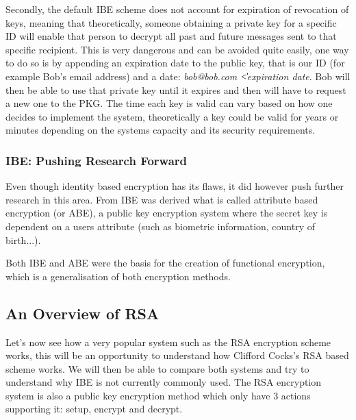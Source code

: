\documentclass[conference]{IEEEtran}
\begin{document}
Secondly, the default IBE scheme does not account for expiration of revocation of keys,
meaning that theoretically, someone obtaining a private key for a specific ID will enable 
that person to decrypt all past and future messages sent to that specific recipient.
This is very dangerous and can be avoided quite easily, one way to do so is by appending an 
expiration date to the public key, that is our ID (for example Bob's email address) and a date:
\textit{bob@bob.com \|\| <expiration date}. Bob will then be able to use that private key until 
it expires and then will have to request a new one to the PKG. The time each key is valid can 
vary based on how one decides to implement the system, theoretically a key could 
be valid for years or minutes depending on the systems capacity and its security requirements.

\subsubsection{IBE: Pushing Research Forward}
Even though identity based encryption has its flaws, it did however 
push further research in this area. From IBE was derived what is called
attribute based encryption (or ABE), a public key encryption system where the secret key is dependent 
on a users attribute (such as biometric information, country of birth...).

Both IBE and ABE were the basis for the creation of functional encryption, 
which is a generalisation of both encryption methods.


\subsection{An Overview of RSA}
Let's now see how a very popular system such as the RSA encryption scheme works, 
this will be an opportunity to understand how Clifford Cocks's RSA based scheme works.
We will then be able to compare both systems and try to understand why 
IBE is not currently commonly used.
The RSA encryption system is also a public key encryption method 
which only have 3 actions supporting it: setup, encrypt and decrypt.
\end{document}
